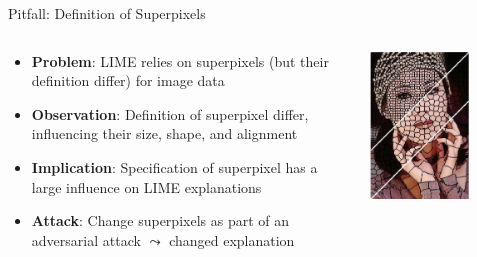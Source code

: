 \documentclass[11pt,compress,t,notes=noshow, aspectratio=169, xcolor=table]{beamer}
\begin{document}
\begin{frame}{Pitfall: Definition of Superpixels }

\begin{columns}[totalwidth=\textwidth]
    
    \begin{column}{0.6\textwidth}
        
        \begin{itemize}
        	\item \textbf{Problem}: LIME relies on superpixels (but their definition differ) for image data
        	\item \textbf{Observation}: Definition of superpixel differ, influencing their size, shape, and alignment 
        	\pause
        	\item \textbf{Implication}: Specification of superpixel has a large influence on LIME explanations 
        	\item \textbf{Attack}: Change superpixels as part of an adversarial attack $\leadsto$ changed explanation
        \end{itemize}
        
    \end{column}
    
    \begin{column}{0.4\textwidth}
    
        \centering
        \includegraphics[width=0.7\textwidth]{figure/superpixel_woman}
        
    \end{column}
    
\end{columns}

\end{frame}


\endlecture
\end{document}
